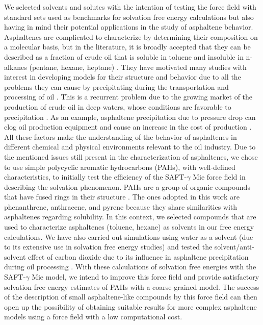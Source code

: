 \documentclass[preprint]{elsarticle}
\begin{document}
	We selected solvents and solutes with the intention of testing the force field with standard sets used as benchmarks for solvation free energy calculations but also having in mind their potential applications in the study of asphaltene behavior. Asphaltenes are complicated to characterize by determining their composition on a molecular basis, but in the literature, it is broadly accepted that they can be described as a fraction of crude oil that is soluble in toluene and insoluble in n-alkanes (pentane, hexane, heptane) \cite{SJOBLOM2003399}. They have motivated many studies with interest in developing models for their structure and behavior due to all the problems they can cause by precipitating during the transportation and processing of oil \cite{SJOBLOM20151}. This is a recurrent problem due to the growing market of the production of crude oil in deep waters, whose conditions are favorable to precipitation \cite{AIC:AIC10243}. As an example, asphaltene precipitation due to pressure drop can clog oil production equipment and cause an increase in the cost of production \cite{doi:10.1021/ef010047l}. All these factors make the understanding of the behavior of asphaltenes in different chemical and physical environments relevant to the oil industry. Due to the mentioned issues still present in the characterization of asphaltenes, we chose to use simple polycyclic aromatic hydrocarbons (PAHs), with well-defined characteristics, to initially test the efficiency of the SAFT-$\gamma$ Mie force field in describing the solvation phenomenon. PAHs are a group of organic compounds that have fused rings in their structure \cite{RAVINDRA20082895}. The ones adopted in this work are phenanthrene, anthracene, and pyrene because they share similarities with asphaltenes regarding solubility. In this context, we selected compounds that are used to characterize asphaltenes (toluene, hexane) as solvents in our free energy calculations. We have also carried out simulations using water as a solvent (due to its extensive use in solvation free energy studies) and tested the solvent/anti-solvent effect of carbon dioxide due to its influence in asphaltene precipitation during oil processing \cite{SOROUSH2014405}. With these calculations of solvation free energies with the SAFT-$\gamma$ Mie model, we intend to improve this force field and provide satisfactory solvation free energy estimates of PAHs with a coarse-grained model. The success of the description of small asphaltene-like compounds by this force field can then open up the possibility of obtaining suitable results for more complex asphaltene models using a force field with a low computational cost.
	
\end{document}
